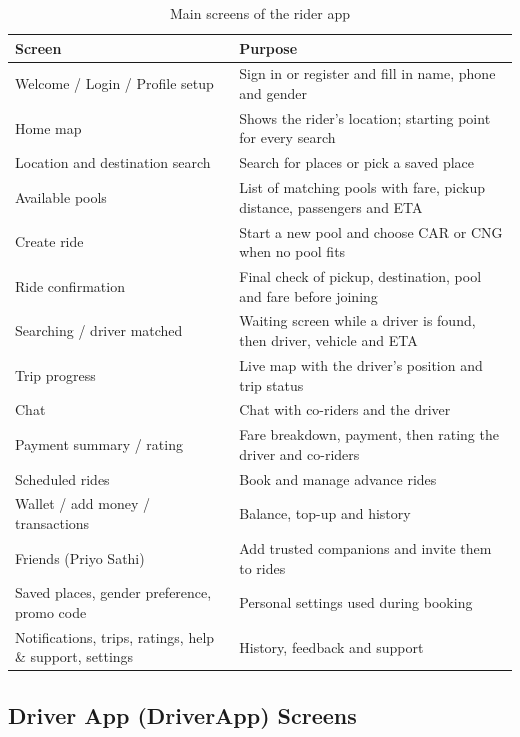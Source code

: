 \begin{table}[H]
  \centering
  \small
  \caption{Main screens of the rider app}
  \label{tab:rider-screens}
  \begin{tabularx}{\textwidth}{@{}p{5.2cm}L@{}}
    \toprule
    \textbf{Screen} & \textbf{Purpose} \\
    \midrule
    Welcome / Login / Profile setup & Sign in or register and fill in name, phone and gender \\
    Home map & Shows the rider's location; starting point for every search \\
    Location and destination search & Search for places or pick a saved place \\
    Available pools & List of matching pools with fare, pickup distance, passengers and ETA \\
    Create ride & Start a new pool and choose CAR or CNG when no pool fits \\
    Ride confirmation & Final check of pickup, destination, pool and fare before joining \\
    Searching / driver matched & Waiting screen while a driver is found, then driver, vehicle and ETA \\
    Trip progress & Live map with the driver's position and trip status \\
    Chat & Chat with co-riders and the driver \\
    Payment summary / rating & Fare breakdown, payment, then rating the driver and co-riders \\
    Scheduled rides & Book and manage advance rides \\
    Wallet / add money / transactions & Balance, top-up and history \\
    Friends (Priyo Sathi) & Add trusted companions and invite them to rides \\
    Saved places, gender preference, promo code & Personal settings used during booking \\
    Notifications, trips, ratings, help \& support, settings & History, feedback and support \\
    \bottomrule
  \end{tabularx}
\end{table}

\subsection{Driver App (DriverApp) Screens}

